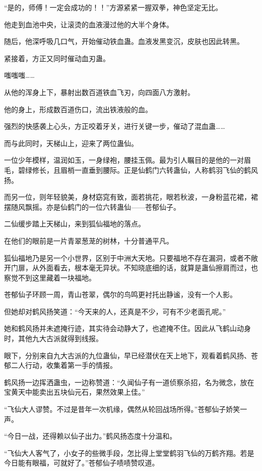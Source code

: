 \begin{this_body}
“是的，师傅！一定会成功的！！”方源紧紧一握双拳，神色坚定无比。

他走到血池中央，让滚烫的血液漫过他的大半个身体。

随后，他深呼吸几口气，开始催动铁血蛊。血液发黑变沉，皮肤也因此转黑。

紧接着，方正又同时催动血刃蛊。

嗤嗤嗤……

从他的浑身上下，暴射出数百道铁血飞刃，向四面八方激射。

他的身上，形成数百道伤口，流出铁液般的血。

强烈的快感袭上心头，方正咬着牙关，进行关键一步，催动了混血蛊……

而与此同时，天梯山上，迎来了两位蛊仙。

一位少年模样，温润如玉，一身绿袍，腰挂玉佩。最为引人瞩目的是他的一对眉毛，碧绿修长，且眉梢一直垂到腰际。正是仙鹤门六转蛊仙，人称鹤羽飞仙的鹤风扬。

而另一位，则年轻貌美，身材窈窕有致，面若挑花，眼若秋波，一身粉蓝花裙，裙摆随风飘摇。亦是仙鹤门的一位六转蛊仙——苍郁仙子。

二仙缓步踏上天梯山，来到狐仙福地的落点。

在他们的眼前是一片青翠葱茏的树林，十分普通平凡。

狐仙福地乃是另一个小世界，区别于中洲大天地。只要福地不存在漏洞，或者不敞开门扉，从外面看去，根本毫无异状。不知晓底细的话，就算是蛊仙擦肩而过，也察觉不到这里藏着一块福地。

苍郁仙子环顾一周，青山苍翠，偶尔的鸟鸣更衬托出静谧，没有一个人影。

但她却对鹤风扬笑道：“今天来的人，还真是不少，可有不少老面孔呢。”

她和鹤风扬并未遮掩行迹，其实待会动静大了，也遮掩不住。因此从飞鹤山动身时，其他九大古派就得到线报。

眼下，分别来自九大古派的九位蛊仙，早已经潜伏在天上地下，观看着鹤风扬、苍郁二人行动，收集着第一手的情报。

鹤风扬一边挥洒蛊虫，一边称赞道：“久闻仙子有一道侦察杀招，名为微念，放在宝黄天中能卖出五块仙元石，果然效果上佳。”

“飞仙大人谬赞。不过是昔年一次机缘，偶然从轮回战场所得。”苍郁仙子娇笑一声。

“今日一战，还得赖以仙子出力。”鹤风扬态度十分温和。

“飞仙大人客气了，小女子的些微手段，怎比得上堂堂鹤羽飞仙的万鹤齐翔。若是今日能有眼福，可就好了。”苍郁仙子啧啧赞叹道。


\end{this_body}
